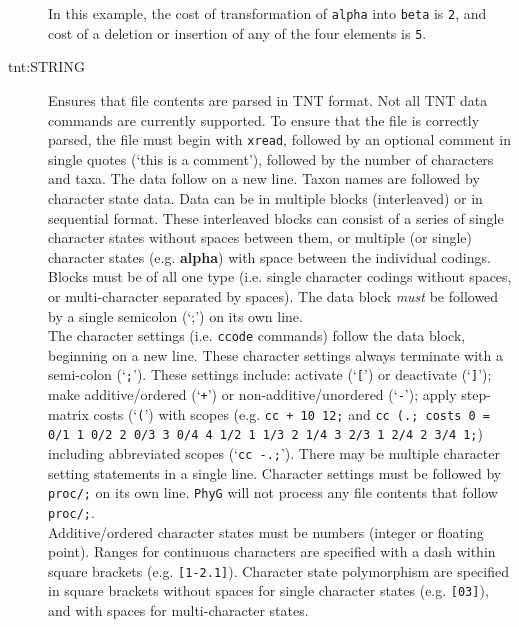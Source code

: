 \begin{description}
		In this example, the cost of transformation of \texttt{alpha} into \texttt{beta} is \texttt{2},
		and cost of a deletion or insertion of any of the four elements is \texttt{5}.

		\item [tnt:STRING] Ensures that file contents are parsed in TNT \citep{Goloboffetal2008} 
		format. Not all TNT data commands are currently supported. To ensure that the file is 
		correctly parsed, the file must begin with \texttt{xread}, followed by an optional comment 
		in single quotes (`this is a comment'), followed by the number of characters and taxa. The 
		data follow on a new line. Taxon names are followed by character state data. Data can be in 
		multiple blocks (interleaved) or in sequential format. These interleaved blocks can consist 
		of a series of single character states without spaces between them, or multiple (or single) 
		character states (e.g. \textbf{alpha}) with space between the individual codings. Blocks 
		must be of all one type (i.e. single character codings without spaces, or multi-character 
		separated by spaces). The data block \textit{must} be followed by a single semicolon 
		(`;') on its own line.\\
			
		The character settings (i.e. \texttt{ccode} commands) follow the data block, beginning 
		on a 	new line. These character settings always terminate with a semi-colon (`\texttt{;}'). 
		These settings include: activate (`\texttt{[}') or deactivate (`\texttt{]}'); make additive/ordered 
		(`\texttt{+}') or non-additive/unordered (`\texttt{-}'); apply step-matrix costs (`\texttt{(}') with 
		scopes (e.g. \texttt{cc + 10 12;} and  \texttt{cc (.; costs 0 = 0/1 1 0/2 2 0/3 3 0/4 4 1/2 1 
		1/3 2 1/4 3 2/3 1 2/4 2 3/4 1;}) including abbreviated scopes (`\texttt{cc -.;}'). There may 
		be multiple character setting statements in a single line. Character settings must be 
		followed by \texttt{proc/;} on its own line. \texttt{PhyG} will not process
		any file contents that follow \texttt{proc/;}.\\
		  
		 Additive/ordered character states must be numbers (integer or floating point). Ranges 
		 for continuous characters are specified with a dash within square brackets (e.g. 
		 \texttt{[1-2.1]}). Character state polymorphism are specified in square brackets without 
		 spaces for single character states (e.g. \texttt{[03]}), and with spaces for multi-character 
		 states.\\
		  

\end{description}
